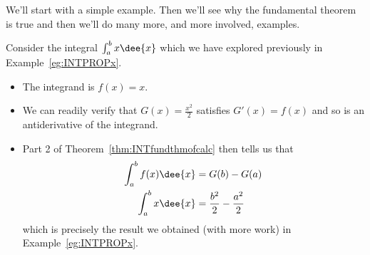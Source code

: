 We'll start with a simple example. Then we'll see why the
fundamental theorem is true and then we'll do many more, and more involved,
examples.
\begin{eg}\label{eg first}
 Consider the integral $\int_a^b x \dee{x}$ which we have explored previously
in Example~\ref{eg:INTPROPx}.
\begin{itemize}
 \item The integrand is $f(x)=x$.
 \item We can readily verify that $G(x) = \frac{x^2}{2}$ satisfies $G'(x)=f(x)$
and so is an antiderivative of the integrand.
\item Part 2 of Theorem~\ref{thm:INTfundthmofcalc} then tells us that
\begin{align*}
  \int_a^b f(x) \dee{x} &= G(b)-G(a) \\
  \int_a^b x \dee{x} &= \frac{b^2}{2} - \frac{a^2}{2}
\end{align*}
which is precisely the result we obtained (with more work) in
Example~\ref{eg:INTPROPx}.
\end{itemize}
\end{eg}


